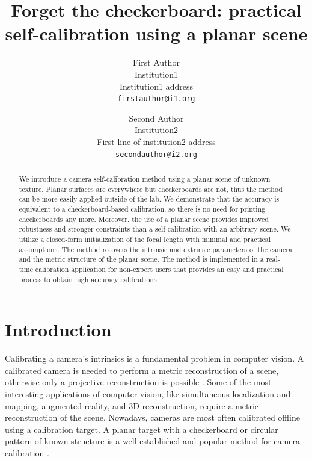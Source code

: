 \documentclass[10pt,twocolumn,letterpaper]{article}
\begin{document}
\title{Forget the checkerboard: practical self-calibration using a planar scene}

\author{First Author\\
Institution1\\
Institution1 address\\
{\tt\small firstauthor@i1.org}
\and
Second Author\\
Institution2\\
First line of institution2 address\\
{\tt\small secondauthor@i2.org}
}

\maketitle


\begin{abstract}
We introduce a camera self-calibration method using a planar scene of unknown texture. Planar surfaces are everywhere but checkerboards are not, thus the method can be more easily applied outside of the lab. We demonstrate that the accuracy is equivalent to a checkerboard-based calibration, so there is no need for printing checkerboards any more. Moreover, the use of a planar scene provides improved robustness and stronger constraints than a self-calibration with an arbitrary scene. We utilize a closed-form initialization of the focal length with minimal and practical assumptions. The method recovers the intrinsic and extrinsic parameters of the camera and the metric structure of the planar scene. The method is implemented in a real-time calibration application for non-expert users that provides an easy and practical process to obtain high accuracy calibrations. 
\end{abstract}

\section{Introduction}

Calibrating a camera's intrinsics is a fundamental problem in computer vision. A calibrated camera is needed to perform a metric reconstruction of a scene, otherwise only a projective reconstruction is possible \cite{hartley2003}. Some of the most interesting applications of computer vision, like simultaneous localization and mapping, augmented reality, and 3D reconstruction, require a metric reconstruction of the scene. Nowadays, cameras are most often calibrated offline using a calibration target. A planar target with a checkerboard or circular pattern of known structure is a well established and popular method for camera calibration \cite{sturm1999,zhang1999,bouguetMCT,kannala2008}.
\end{document}
